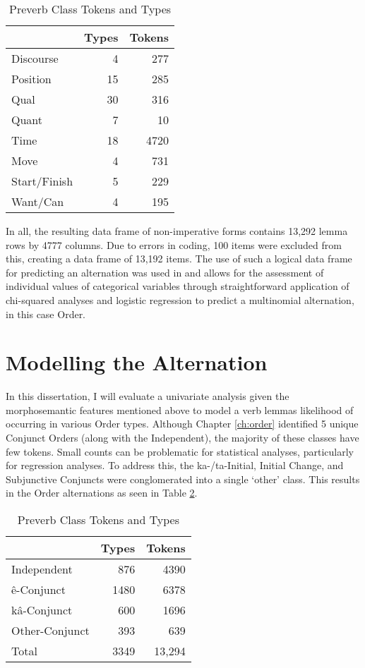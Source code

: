 \begin{table}
\centering
\begin{tabular}{lrr} \\
\toprule
             & Types & Tokens \\
\midrule

Discourse    & 4     & 277    \\
Position     & 15    & 285    \\
Qual         & 30    & 316    \\
Quant        & 7     & 10     \\
Time         & 18    & 4720   \\
Move         & 4     & 731    \\
Start/Finish & 5     & 229    \\
Want/Can     & 4     & 195   \\
\bottomrule
\end{tabular}
\caption{Preverb Class Tokens and Types \label{tab:pv}
}
\end{table}

In all, the resulting data frame of non-imperative forms contains 13,292 lemma rows by 4777 columns. Due to errors in coding, 100 items were excluded from this, creating a data frame of 13,192 items. The use of such a logical data frame for predicting an alternation was used in \citet{arppe2008univariate} and allows for the assessment of individual values of categorical variables through straightforward application of chi-squared analyses and logistic regression to predict a multinomial alternation, in this case Order. 

\section{Modelling the Alternation}
In this dissertation, I will evaluate a univariate analysis given the morphosemantic features mentioned above to model a verb lemmas likelihood of occurring in various Order types. Although Chapter \ref{ch:order} identified 5 unique Conjunct Orders (along with the Independent), the majority of these classes have few tokens. Small counts can be problematic for statistical analyses, particularly for regression analyses. To address this, the ka-/ta-Initial, Initial Change, and Subjunctive Conjuncts were conglomerated into  a single `other' class. This results in the Order alternations as seen in Table \ref{tab:corporder}.

\begin{table}
\centering
\begin{tabular}{lrr} \\
\toprule
               & Types & Tokens \\
\midrule
Independent    &  876  & 4390   \\
ê-Conjunct     & 1480  & 6378   \\
kâ-Conjunct    &  600  & 1696   \\
Other-Conjunct &  393  & 639   \\
\midrule
Total &  3349  & 13,294   \\
\bottomrule
\end{tabular}
\caption{Preverb Class Tokens and Types \label{tab:corporder}
}
\end{table}

